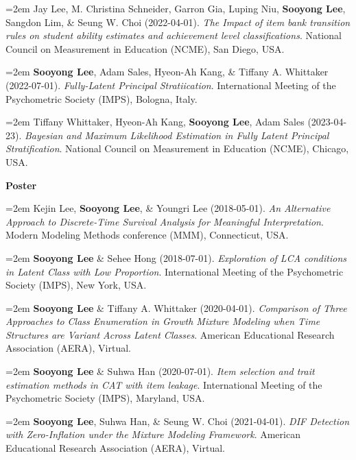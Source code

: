 \documentclass[11pt,letterpaper,]{awesome-me}
\begin{document}
\hangindent=2em  Jay Lee, M. Christina Schneider, Garron
Gia, Luping Niu, \textbf{Sooyong Lee}, Sangdon Lim, \& Seung W. Choi
(2022-04-01). \emph{The Impact of item bank transition rules on student
ability estimates and achievement level classifications}. National
Council on Measurement in Education (NCME), San Diego, USA.

\hangindent=2em  \textbf{Sooyong Lee}, Adam Sales, Hyeon-Ah
Kang, \& Tiffany A. Whittaker (2022-07-01). \emph{Fully-Latent Principal
Stratiication}. International Meeting of the Psychometric Society
(IMPS), Bologna, Italy.

\hangindent=2em  Tiffany Whittaker, Hyeon-Ah Kang,
\textbf{Sooyong Lee}, Adam Sales (2023-04-23). \emph{Bayesian and
Maximum Likelihood Estimation in Fully Latent Principal Stratification}.
National Council on Measurement in Education (NCME), Chicago, USA.

\setlength{\leftskip}{0cm}

\textbf{Poster}

\setlength{\leftskip}{0.5cm}

\hangindent=2em  Kejin Lee, \textbf{Sooyong Lee}, \& Youngri
Lee (2018-05-01). \emph{An Alternative Approach to Discrete-Time
Survival Analysis for Meaningful Interpretation}. Modern Modeling
Methods conference (MMM), Connecticut, USA.

\hangindent=2em  \textbf{Sooyong Lee} \& Sehee Hong
(2018-07-01). \emph{Exploration of LCA conditions in Latent Class with
Low Proportion}. International Meeting of the Psychometric Society
(IMPS), New York, USA.

\hangindent=2em  \textbf{Sooyong Lee} \& Tiffany A.
Whittaker (2020-04-01). \emph{Comparison of Three Approaches to Class
Enumeration in Growth Mixture Modeling when Time Structures are Variant
Across Latent Classes}. American Educational Research Association
(AERA), Virtual.

\hangindent=2em  \textbf{Sooyong Lee} \& Suhwa Han
(2020-07-01). \emph{Item selection and trait estimation methods in CAT
with item leakage}. International Meeting of the Psychometric Society
(IMPS), Maryland, USA.

\hangindent=2em  \textbf{Sooyong Lee}, Suhwa Han, \& Seung
W. Choi (2021-04-01). \emph{DIF Detection with Zero-Inflation under the
Mixture Modeling Framework}. American Educational Research Association
(AERA), Virtual.

\setlength{\leftskip}{0cm}
\end{document}
